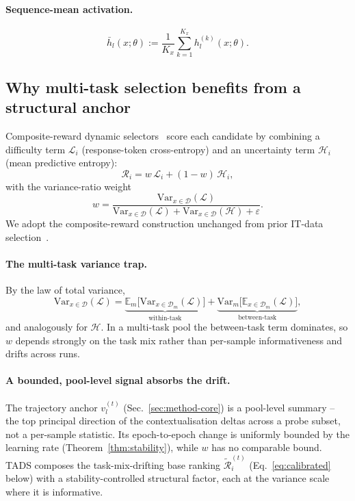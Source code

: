 \paragraph{Sequence-mean activation.}
\begin{equation}
  \bar h_l(x;\theta) :=
  \frac{1}{K_x}\sum_{k=1}^{K_x} h_l^{(k)}(x;\theta).
  \label{eq:meanact}
\end{equation}

\subsection{Why multi-task selection benefits from a structural anchor}
\label{sec:method-motivation}

Composite-reward dynamic selectors~\cite{kung2023activeit,
sun2025dots} score each candidate by combining a difficulty term
$\mathcal{L}_i$ (response-token cross-entropy) and an uncertainty
term $\mathcal{H}_i$ (mean predictive entropy):
\begin{equation}
  \mathcal{R}_i = w\,\mathcal{L}_i + (1-w)\,\mathcal{H}_i,
  \label{eq:composite}
\end{equation}
with the variance-ratio weight
\begin{equation}
  w =
  \frac{\mathrm{Var}_{x \in \mathcal{D}}(\mathcal{L})}
       {\mathrm{Var}_{x \in \mathcal{D}}(\mathcal{L}) +
        \mathrm{Var}_{x \in \mathcal{D}}(\mathcal{H}) + \varepsilon}.
  \label{eq:w}
\end{equation}
We adopt the composite-reward construction unchanged from prior
IT-data selection~\cite{sun2025dots, kung2023activeit}.

\paragraph{The multi-task variance trap.}
By the law of total variance,
\begin{equation}
  \mathrm{Var}_{x \in \mathcal{D}}(\mathcal{L})
  =
  \underbrace{\mathbb{E}_{m}\bigl[\mathrm{Var}_{x \in \mathcal{D}_m}(\mathcal{L})\bigr]}_{\text{within-task}}
  +
  \underbrace{\mathrm{Var}_{m}\bigl[\mathbb{E}_{x \in \mathcal{D}_m}(\mathcal{L})\bigr]}_{\text{between-task}},
  \label{eq:total-variance}
\end{equation}
and analogously for $\mathcal{H}$. In a multi-task pool the
between-task term dominates, so $w$ depends strongly on the task
mix rather than per-sample informativeness and drifts across runs.

\paragraph{A bounded, pool-level signal absorbs the drift.}
The trajectory anchor $v_l^{(t)}$ (Sec.~\ref{sec:method-core}) is a
pool-level summary -- the top principal direction of the
contextualisation deltas across a probe subset, not a per-sample
statistic. Its epoch-to-epoch change is uniformly bounded by the
learning rate (Theorem~\ref{thm:stability}), while $w$ has no
comparable bound. \textsc{TADS} composes the task-mix-drifting
base ranking $\tilde{\mathcal{R}}_i^{(t)}$ (Eq.~\ref{eq:calibrated}
below) with a stability-controlled structural factor, each at the
variance scale where it is informative.


